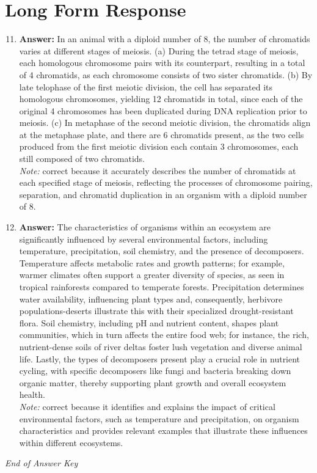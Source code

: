 \documentclass[12pt]{article}
\begin{document}
\section*{Long Form Response}
\begin{enumerate}[label=\arabic*.]
\setcounter{enumi}{10}
\item \textbf{Answer:} In an animal with a diploid number of 8, the number of chromatids varies at different stages of meiosis. (a) During the tetrad stage of meiosis, each homologous chromosome pairs with its counterpart, resulting in a total of 4 chromatids, as each chromosome consists of two sister chromatids. (b) By late telophase of the first meiotic division, the cell has separated its homologous chromosomes, yielding 12 chromatids in total, since each of the original 4 chromosomes has been duplicated during DNA replication prior to meiosis. (c) In metaphase of the second meiotic division, the chromatids align at the metaphase plate, and there are 6 chromatids present, as the two cells produced from the first meiotic division each contain 3 chromosomes, each still composed of two chromatids.
\\ \textit{Note:} correct because it accurately describes the number of chromatids at each specified stage of meiosis, reflecting the processes of chromosome pairing, separation, and chromatid duplication in an organism with a diploid number of 8.
\item \textbf{Answer:} The characteristics of organisms within an ecosystem are significantly influenced by several environmental factors, including temperature, precipitation, soil chemistry, and the presence of decomposers. Temperature affects metabolic rates and growth patterns; for example, warmer climates often support a greater diversity of species, as seen in tropical rainforests compared to temperate forests. Precipitation determines water availability, influencing plant types and, consequently, herbivore populations-deserts illustrate this with their specialized drought-resistant flora. Soil chemistry, including pH and nutrient content, shapes plant communities, which in turn affects the entire food web; for instance, the rich, nutrient-dense soils of river deltas foster lush vegetation and diverse animal life. Lastly, the types of decomposers present play a crucial role in nutrient cycling, with specific decomposers like fungi and bacteria breaking down organic matter, thereby supporting plant growth and overall ecosystem health.
\\ \textit{Note:} correct because it identifies and explains the impact of critical environmental factors, such as temperature and precipitation, on organism characteristics and provides relevant examples that illustrate these influences within different ecosystems.
\end{enumerate}

\vfill
\noindent\textit{End of Answer Key}
\end{document}
